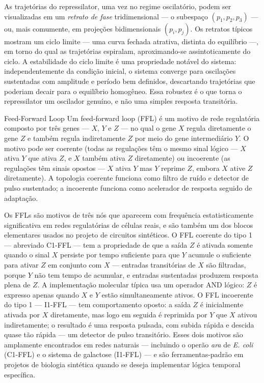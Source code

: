 As trajetórias do repressilator, uma vez no regime oscilatório, podem ser visualizadas em um \emph{retrato de fase} tridimensional --- o subespaço $(p_1, p_2, p_3)$ --- ou, mais comumente, em projeções bidimensionais $(p_i, p_j)$. Os retratos típicos mostram um ciclo limite --- uma curva fechada atrativa, distinta do equilíbrio ---, em torno do qual as trajetórias espiralam, aproximando-se assintoticamente do ciclo. A estabilidade do ciclo limite é uma propriedade notável do sistema: independentemente da condição inicial, o sistema converge para oscilações sustentadas com amplitude e período bem definidos, descartando trajetórias que poderiam decair para o equilíbrio homogêneo. Essa robustez é o que torna o repressilator um oscilador genuíno, e não uma simples resposta transitória.

\begin{definicao}{Feed-Forward Loop}
Um feed-forward loop (FFL) é um motivo de rede regulatória composto por três genes --- $X$, $Y$ e $Z$ --- no qual o gene $X$ regula diretamente o gene $Z$ e também regula indiretamente $Z$ por meio do gene intermediário $Y$. O motivo pode ser coerente (todas as regulações têm o mesmo sinal lógico --- $X$ ativa $Y$ que ativa $Z$, e $X$ também ativa $Z$ diretamente) ou incoerente (as regulações têm sinais opostos --- $X$ ativa $Y$ mas $Y$ reprime $Z$, embora $X$ ative $Z$ diretamente). A topologia coerente funciona como filtro de ruído e detector de pulso sustentado; a incoerente funciona como acelerador de resposta seguido de adaptação.
\end{definicao}

Os FFLs são motivos de três nós que aparecem com frequência estatisticamente significativa em redes regulatórias de células reais, e são também um dos blocos elementares usados no projeto de circuitos sintéticos. O FFL coerente do tipo 1 --- abreviado C1-FFL --- tem a propriedade de que a saída $Z$ é ativada somente quando o sinal $X$ persiste por tempo suficiente para que $Y$ acumule o suficiente para ativar $Z$ em conjunto com $X$ --- entradas transitórias de $X$ são filtradas, porque $Y$ não tem tempo de acumular, e entradas sustentadas produzem resposta plena de $Z$. A implementação molecular típica usa um operador AND lógico: $Z$ é expresso apenas quando $X$ e $Y$ estão simultaneamente ativos. O FFL incoerente do tipo 1 --- I1-FFL --- tem comportamento oposto: a saída $Z$ é inicialmente ativada por $X$ diretamente, mas logo em seguida é reprimida por $Y$ que $X$ ativou indiretamente; o resultado é uma resposta pulsada, com subida rápida e descida quase tão rápida --- um detector de pulso transitório. Esses dois motivos são amplamente encontrados em redes naturais --- incluindo o operão \textit{ara} de \textit{E. coli} (C1-FFL) e o sistema de galactose (I1-FFL) --- e são ferramentas-padrão em projetos de biologia sintética quando se deseja implementar lógica temporal específica.



